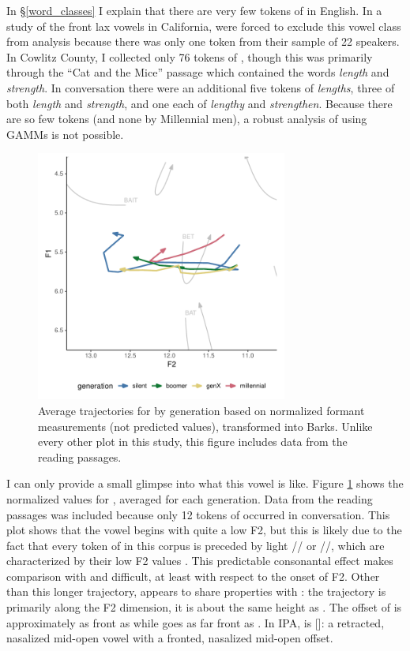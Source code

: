 In \S\ref{word_classes} I explain that there are very few tokens of \beng in English. In a study of the front lax vowels in California, \citet[40]{cardoso_etal_2016_pads} were forced to exclude this vowel class from analysis because there was only one token from their sample of 22 speakers. In Cowlitz County, I collected only 76 tokens of \beng, though this was primarily through the ``Cat and the Mice'' passage which contained the words \textit{length} and \textit{strength}. In conversation there were an additional five tokens of \textit{lengths}, three of both \textit{length} and \textit{strength}, and one each of \textit{lengthy} and \textit{strengthen}. Because there are so few tokens (and none by Millennial men), a robust analysis of \beng using GAMMs is not possible.

\begin{figure}[tb!]
	\centering
	\includegraphics[width = 3.25in]{Figures/BENG/BENG_raw.pdf}
	\caption[Average trajectories for \beng by generation.]{Average trajectories for \beng by generation based on normalized formant measurements (not predicted values), transformed into Barks. Unlike every other plot in this study, this figure includes data from the reading passages.}
	\label{fig:BENG}
\end{figure}

I can only provide a small glimpse into what this vowel is like. Figure \ref{fig:BENG} shows the normalized values for \beng, averaged for each generation. Data from the reading passages was included because only 12 tokens of \beng occurred in conversation. This plot shows that the
\beng vowel begins with quite a low F2, but this is likely due to the fact that every token of \beng in this corpus is preceded by light // or //, which are characterized by their low F2 values \citep{olive_etal_1993}. This predictable consonantal effect makes comparison with \bang and \bing difficult, at least with respect to the onset of F2. Other than this longer trajectory, \beng appears to share properties with \bang: the trajectory is primarily along the F2 dimension, it is about the same height as \bet. The offset of \beng is approximately as front as \bit while \bang goes as far front as \fleece. In IPA, \beng is []: a retracted, nasalized mid-open vowel with a fronted, nasalized mid-open offset.

